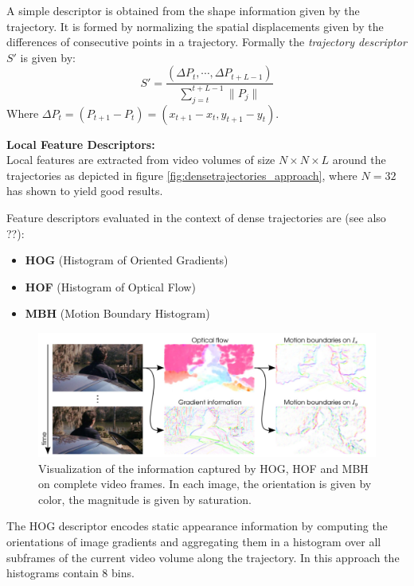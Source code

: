 A simple descriptor is obtained from the shape information given by the trajectory.
It is formed by normalizing the spatial displacements given by the differences of consecutive points in a trajectory.
Formally the \textit{trajectory descriptor} $S'$ is given by:
\begin{equation*}
    S' = \frac{(\Delta P_t, \cdots, \Delta P_{t+L-1})}{\sum_{j=t}^{t+L-1} \|P_j\|}
\end{equation*}
Where $\Delta P_t = (P_{t+1} - P_t) = (x_{t+1} - x_t, y_{t+1} - y_t)$.

\textbf{Local Feature Descriptors:}\\
Local features are extracted from video volumes of size $N \times N \times L$ around the trajectories as depicted in figure \ref{fig:densetrajectories_approach}, where $N = 32$ has shown to yield good results.

Feature descriptors evaluated in the context of dense trajectories are (see also ??):
\begin{itemize}
    \item \textbf{HOG} (Histogram of Oriented Gradients) \cite{dalal_histograms_2005-1}
    \item \textbf{HOF} (Histogram of Optical Flow) \cite{laptev_learning_2008}
    \item \textbf{MBH} (Motion Boundary Histogram) \cite{dalal_human_2006}
\end{itemize}

\begin{figure}[H]
    \centering
    \includegraphics[width=\textwidth]{img_conventional/densetrajectories_featurevisualization}
    \caption{Visualization of the information captured by HOG, HOF and MBH on complete video frames. In each image, the orientation is given by color, the magnitude is given by saturation. \cite{wang_action_2011}}
    \label{fig:densetrajectories_featurevisualization}
\end{figure}

The HOG descriptor encodes static appearance information by computing the orientations of image gradients and aggregating them in a histogram over all subframes of the current video volume along the trajectory. In this approach the histograms contain 8 bins.

